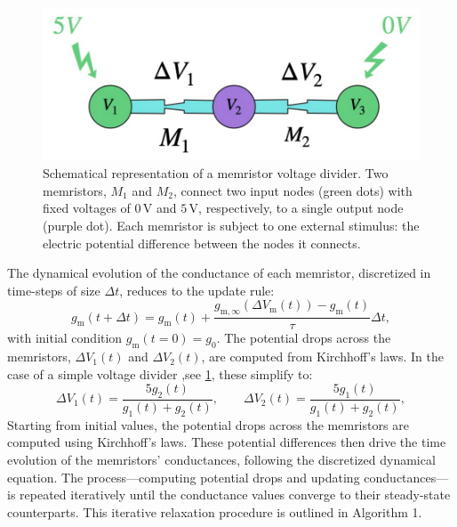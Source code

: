 \documentclass[reprint,superscriptaddress,prb,showkeys]{revtex4-2}
\newcommand{\m}{\text{m}} %
\begin{document}
\begin{figure}[H]
    \centering
    \includegraphics[width=0.5\columnwidth]{plots/appendixA/app_vd.pdf}
    \caption{Schematical representation of a memristor voltage divider. Two memristors, \( M_1 \) and \( M_2 \), connect two input nodes (green dots) with fixed voltages of \( 0\,\mathrm{V} \) and \( 5\,\mathrm{V} \), respectively, to a single output node (purple dot). Each memristor is subject to one external stimulus: the electric potential difference between the nodes it connects.
    }
    \label{fig:app_vd}
\end{figure} 
The dynamical evolution of the conductance of each memristor, discretized in time-steps of size $\Delta t$, reduces to the update rule:
\begin{equation}
g_{\m}(t + \Delta t) = g_{\m}(t) +
\frac{g_{\m,\infty}(\Delta V_{\m}(t)) - g_{\m}(t)}{\tau} \Delta t,
\label{eq:conduct}
\end{equation}
with initial condition $g_{\m}(t = 0) = g_0$. The potential drops across the memristors, $\Delta V_1(t)$ and $\Delta V_2(t)$, are computed from Kirchhoff's laws. In the case of a simple voltage divider ,see \cref{fig:app_vd}, these simplify to:
\begin{equation}
\Delta V_1(t) = \frac{5 g_2(t)}{g_1(t)+g_2(t)}, \qquad
\Delta V_2(t) = \frac{5 g_1(t)}{g_1(t)+g_2(t)},
\label{eq:potentials}
\end{equation}
Starting from initial values, the potential drops across the memristors are computed using Kirchhoff’s laws. These potential differences then drive the time evolution of the memristors’ conductances, following the discretized dynamical equation. The process—computing potential drops and updating conductances—is repeated iteratively until the conductance values converge to their steady-state counterparts. This iterative relaxation procedure is outlined in Algorithm 1.
\end{document}
